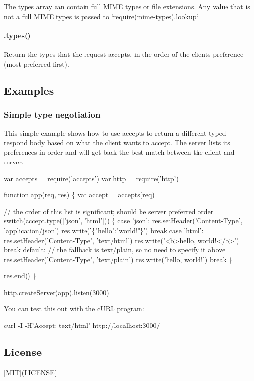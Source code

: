The {\ttfamily types} array can contain full M\+I\+ME types or file extensions. Any value that is not a full M\+I\+ME types is passed to `require(\textquotesingle{}mime-\/types\textquotesingle{}).lookup`.

\paragraph*{.types()}

Return the types that the request accepts, in the order of the client\textquotesingle{}s preference (most preferred first).

\subsection*{Examples}

\subsubsection*{Simple type negotiation}

This simple example shows how to use {\ttfamily accepts} to return a different typed respond body based on what the client wants to accept. The server lists it\textquotesingle{}s preferences in order and will get back the best match between the client and server.


\begin{DoxyCode}
var accepts = require('accepts')
var http = require('http')

function app(req, res) \{
  var accept = accepts(req)

  // the order of this list is significant; should be server preferred order
  switch(accept.type(['json', 'html'])) \{
    case 'json':
      res.setHeader('Content-Type', 'application/json')
      res.write('\{"hello":"world!"\}')
      break
    case 'html':
      res.setHeader('Content-Type', 'text/html')
      res.write('<b>hello, world!</b>')
      break
    default:
      // the fallback is text/plain, so no need to specify it above
      res.setHeader('Content-Type', 'text/plain')
      res.write('hello, world!')
      break
  \}

  res.end()
\}

http.createServer(app).listen(3000)
\end{DoxyCode}


You can test this out with the c\+U\+RL program\+: 
\begin{DoxyCode}
curl -I -H'Accept: text/html' http://localhost:3000/
\end{DoxyCode}


\subsection*{License}

\mbox{[}M\+IT\mbox{]}(L\+I\+C\+E\+N\+SE) 